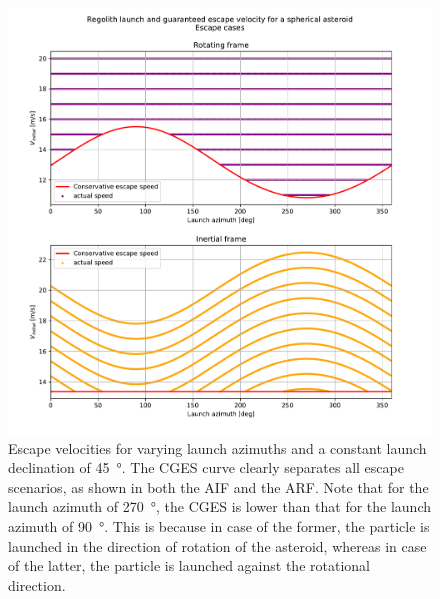 \begin{figure}[htb]
\centering
\captionsetup{justification=centering}
\includegraphics[width=\textwidth, height=0.5\textheight, keepaspectratio=true]{non_conservative_escape_speed/spherical_asteroid_conservative_escape_speed.pdf}
\caption{Escape velocities for varying launch azimuths and a constant launch declination of \protect\SI{45}{\degree}. The \gls{CGES} curve clearly separates all escape scenarios, as shown in both the \protect\gls{AIF} and the \protect\gls{ARF}. Note that for the launch azimuth of \SI{270}{\degree}, the \gls{CGES} is lower than that for the launch azimuth of \SI{90}{\degree}. This is because in case of the former, the particle is launched in the direction of rotation of the asteroid, whereas in case of the latter, the particle is launched against the rotational direction.}
\label{fig:conservative_spherical_asteroid_escape}
\end{figure}
\FloatBarrier
